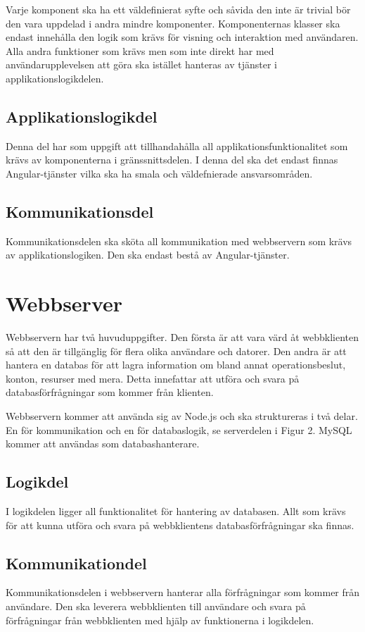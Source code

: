 \documentclass[a4paper,10pt]{article}
\begin{document}
Varje komponent ska ha ett väldefinierat syfte och såvida den inte är trivial bör den vara uppdelad i andra mindre komponenter. Komponenternas klasser ska endast innehålla den logik som krävs för visning och interaktion med användaren. Alla andra funktioner som krävs men som inte direkt har med användarupplevelsen att göra ska istället hanteras av tjänster i applikationslogikdelen.

\subsection{Applikationslogikdel}
Denna del har som uppgift att tillhandahålla all applikationsfunktionalitet som krävs av komponenterna i gränssnittsdelen. I denna del ska det endast finnas Angular-tjänster vilka ska ha smala och väldefnierade ansvarsområden.

\subsection{Kommunikationsdel}
Kommunikationsdelen ska sköta all kommunikation med webbservern som krävs av applikationslogiken. Den ska endast bestå av Angular-tjänster.

\section{Webbserver}
Webbservern har två huvuduppgifter. Den första är att vara värd åt webbklienten så att den är tillgänglig för flera olika användare och datorer. Den andra är att hantera en databas för att lagra information om bland annat operationsbeslut, konton, resurser med mera. Detta innefattar att utföra och svara på databasförfrågningar som kommer från klienten.

Webbservern kommer att använda sig av Node.js och ska struktureras i två delar. En för kommunikation och en för databaslogik, se serverdelen i Figur 2. MySQL kommer att användas som databashanterare.

\subsection{Logikdel}
I logikdelen ligger all funktionalitet för hantering av databasen. Allt som krävs för att kunna utföra och svara på webbklientens databasförfrågningar ska finnas.

\subsection{Kommunikationdel}
Kommunikationsdelen i webbservern hanterar alla förfrågningar som kommer från användare. Den ska leverera webbklienten till användare och svara på förfrågningar från webbklienten med hjälp av funktionerna i logikdelen.
\end{document}
